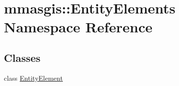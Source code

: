 \hypertarget{namespacemmasgis_1_1EntityElements}{
\section{mmasgis::EntityElements Namespace Reference}
\label{namespacemmasgis_1_1EntityElements}
}
\subsection*{Classes}
\begin{DoxyCompactItemize}
\item 
class \hyperlink{classmmasgis_1_1EntityElements_1_1EntityElement}{EntityElement}
\end{DoxyCompactItemize}
